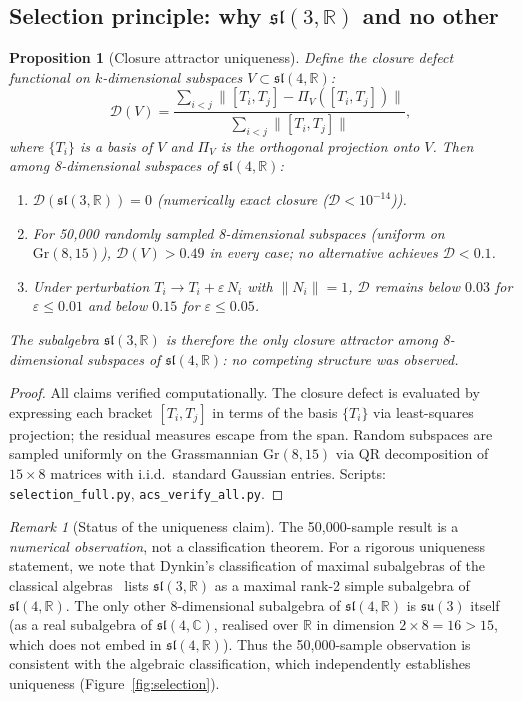 \documentclass[11pt,a4paper]{article}
\theoremstyle{plain}
\newtheorem{proposition}[theorem]{Proposition}
\theoremstyle{definition}
\theoremstyle{remark}
\newtheorem{remark}[theorem]{Remark}
\newcommand{\eps}{\varepsilon}
\begin{document}
\subsection{Selection principle: why $\mathfrak{sl}(3,\mathbb{R})$ and no other}

\begin{proposition}[Closure attractor uniqueness]\label{prop:selection}
Define the closure defect functional on $k$-dimensional subspaces $V \subset \mathfrak{sl}(4,\mathbb{R})$:
\[
  \mathcal{D}(V) = \frac{\sum_{i<j} \| [T_i, T_j] - \Pi_V([T_i, T_j]) \|}{\sum_{i<j} \|[T_i, T_j]\|},
\]
where $\{T_i\}$ is a basis of $V$ and $\Pi_V$ is the orthogonal projection onto $V$.
Then among 8-dimensional subspaces of $\mathfrak{sl}(4,\mathbb{R})$:
\begin{enumerate}[label=(\roman*),noitemsep]
  \item $\mathcal{D}(\mathfrak{sl}(3,\mathbb{R})) = 0$ (numerically exact closure ($\mathcal{D} < 10^{-14}$)).
  \item For 50,000 randomly sampled 8-dimensional subspaces (uniform on $\mathrm{Gr}(8,15)$),
    $\mathcal{D}(V) > 0.49$ in every case; no alternative achieves
    $\mathcal{D} < 0.1$.
  \item Under perturbation $T_i \to T_i + \eps\,N_i$ with
    $\|N_i\| = 1$, $\mathcal{D}$ remains below $0.03$ for
    $\eps \leq 0.01$ and below $0.15$ for $\eps \leq 0.05$.
\end{enumerate}
The subalgebra $\mathfrak{sl}(3,\mathbb{R})$ is therefore the only
closure attractor among 8-dimensional subspaces of $\mathfrak{sl}(4,\mathbb{R})$:
no competing structure was observed.
\end{proposition}

\begin{proof}
All claims verified computationally.  The closure defect is evaluated
by expressing each bracket $[T_i, T_j]$ in terms of the basis $\{T_i\}$
via least-squares projection; the residual measures escape from the span.
Random subspaces are sampled uniformly on the Grassmannian
$\mathrm{Gr}(8,15)$ via QR decomposition of $15 \times 8$ matrices
with i.i.d.\ standard Gaussian entries.
Scripts: \texttt{selection\_full.py}, \texttt{acs\_verify\_all.py}.
\end{proof}

\begin{remark}[Status of the uniqueness claim]\label{rem:uniqueness}
The 50{,}000-sample result is a \emph{numerical observation}, not a
classification theorem.  For a rigorous uniqueness statement, we
note that Dynkin's classification of maximal subalgebras of the
classical algebras~\cite{Dynkin1952} lists $\mathfrak{sl}(3,\mathbb{R})$
as a maximal rank-2 simple subalgebra of $\mathfrak{sl}(4,\mathbb{R})$.
The only other 8-dimensional subalgebra of $\mathfrak{sl}(4,\mathbb{R})$
is $\mathfrak{su}(3)$ itself (as a real subalgebra of $\mathfrak{sl}(4,\mathbb{C})$,
realised over $\mathbb{R}$ in dimension $2 \times 8 = 16 > 15$, which does
not embed in $\mathfrak{sl}(4,\mathbb{R})$).  Thus the 50{,}000-sample observation
is consistent with the algebraic classification, which independently
establishes uniqueness (Figure~\ref{fig:selection}).
\end{remark}
\end{document}
